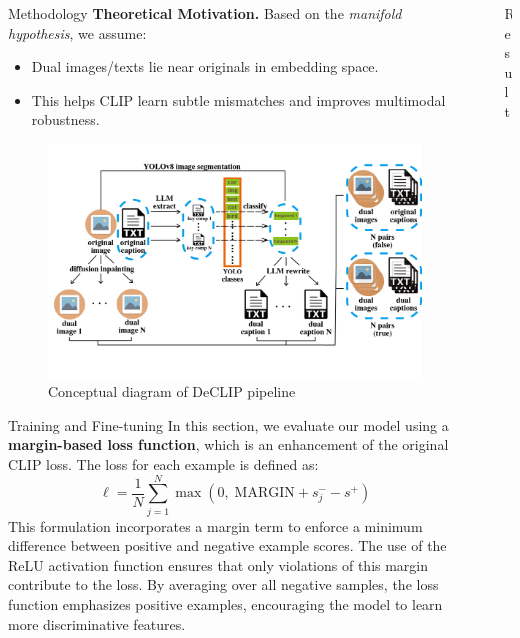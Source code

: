 \documentclass[final]{beamer}
\newlength{\sepwidth}
\newlength{\colwidth}
\newcommand{\separatorcolumn}{\begin{column}{\sepwidth}\end{column}}
\begin{document}
\begin{frame}[t]
\begin{columns}[t]
\begin{column}{\colwidth}
\begin{block}{Methodology}
\textbf{Theoretical Motivation.} Based on the \textit{manifold hypothesis}, we assume:
\begin{itemize}
    \item Dual images/texts lie near originals in embedding space.
    \item This helps CLIP learn subtle mismatches and improves multimodal robustness.
\end{itemize}
\begin{figure}
    \centering
    \includegraphics[width=0.9\linewidth]{poster/overall_method.png}
    \caption{Conceptual diagram of DeCLIP pipeline}
\end{figure}
\end{block}
\begin{block}{Training and Fine-tuning}
In this section, we evaluate our model using a \textbf{margin-based loss function}, which is an enhancement of the original CLIP loss. The loss for each example is defined as:
\[
\ell = \frac{1}{N} \sum_{j=1}^{N} \max\left(0,\; \text{MARGIN} + s_j^{-} - s^{+} \right)
\]
This formulation incorporates a margin term to enforce a minimum difference between positive and negative example scores. The use of the ReLU activation function ensures that only violations of this margin contribute to the loss. By averaging over all negative samples, the loss function emphasizes positive examples, encouraging the model to learn more discriminative features.
\end{block}

\end{column}

\separatorcolumn

  \begin{column}{0.3\textwidth}

\begin{block}{Result}


\end{block}
\end{column}
\end{columns}
\end{frame}
\end{document}
